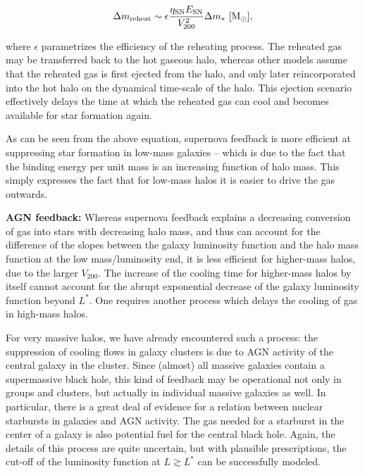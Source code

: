 \documentclass[a4paper,11pt]{article}
\begin{document}
\begin{align*}
    \Delta m_\mathrm{reheat} \sim \epsilon\frac{\eta_\mathrm{SN}E_\mathrm{SN}}{V_{200}^2}\Delta m_* ~ [{\rm M_\odot}],
\end{align*}

{\noindent}where $\epsilon$ parametrizes the efficiency of the reheating process. The reheated gas may be transferred back to the hot gaseous halo, whereas other models assume that the reheated gas is first ejected from the halo, and only later reincorporated into the hot halo on the dynamical time-scale of the halo. This ejection scenario effectively delays the time at which the reheated gas can cool and becomes available for star formation again.

{\noindent}As can be seen from the above equation, supernova feedback is more efficient at suppressing star formation in low-mass galaxies -- which is due to the fact that the binding energy per unit mass is an increasing function of halo mass. This simply expresses the fact that for low-mass halos it is easier to drive the gas outwards.

{\noindent}\textbf{AGN feedback:} Whereas supernova feedback explains a decreasing conversion of gas into stars with decreasing halo mass, and thus can account for the difference of the slopes between the galaxy luminosity function and the halo mass function at the low mass/luminosity end, it is less efficient for higher-mass halos, due to the larger $V_{200}$. The increase of the cooling time for higher-mass halos by itself cannot account for the abrupt exponential decrease of the galaxy luminosity function beyond $L^*$. One requires another process which delays the cooling of gas in high-mass halos.

{\noindent}For very massive halos, we have already encountered such a process: the suppression of cooling flows in galaxy clusters is due to AGN activity of the central galaxy in the cluster. Since (almost) all massive galaxies contain a supermassive black hole, this kind of feedback may be operational not only in groups and clusters, but actually in individual massive galaxies as well. In particular, there is a great deal of evidence for a relation between nuclear starbursts in galaxies and AGN activity. The gas needed for a starburst in the center of a galaxy is also potential fuel for the central black hole. Again, the details of this process are quite uncertain, but with plausible prescriptions, the cut-off of the luminosity function at $L\gtrsim L^*$ can be successfully modeled.
\end{document}

